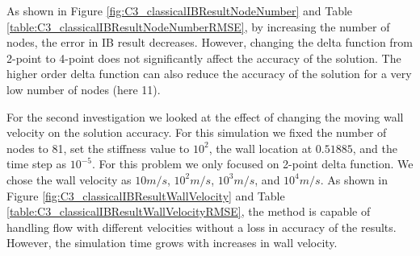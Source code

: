 As shown in Figure \ref{fig:C3_classicalIBResultNodeNumber} and Table \ref{table:C3_classicalIBResultNodeNumberRMSE}, by increasing the number of nodes, the error in IB result decreases. However, changing the delta function from 2-point to 4-point does not significantly affect the accuracy of the solution. The higher order delta function can also reduce the accuracy of the solution for a very low number of nodes (here 11). 

For the second investigation we looked at the effect of changing the moving wall velocity on the solution accuracy. For this simulation we fixed the number of nodes to 81, set the stiffness value to $10^2$, the wall location at $0.51885$, and the time step as $10^{-5}$. For this problem we only focused on 2-point delta function. We chose the wall velocity as $10 m/s$, $10^2 m/s$, $10^3 m/s$, and $10^4 m/s$. As shown in Figure \ref{fig:C3_classicalIBResultWallVelocity} and Table \ref{table:C3_classicalIBResultWallVelocityRMSE}, the method is capable of handling flow with different velocities without a loss in accuracy of the results. However, the simulation time grows with increases in wall velocity.


